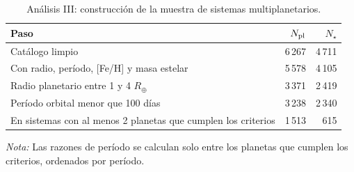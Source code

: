\begin{table}[htbp]
    \centering
    \caption{Análisis III: construcción de la muestra de sistemas multiplanetarios.}
    \label{tab:A3-T1}
    \small
    \begin{tabular}{p{}rr}
    \toprule
    Paso & $N_{\rm pl}$ & $N_\star$ \\
    \midrule
    Catálogo limpio & 6\,267 & 4\,711 \\
    Con radio, período, {[Fe/H]} y masa estelar & 5\,578 & 4\,105 \\
    Radio planetario entre 1 y 4 $R_\oplus$ & 3\,371 & 2\,419 \\
    Período orbital menor que 100 días & 3\,238 & 2\,340 \\
    En sistemas con al menos 2 planetas que cumplen los criterios & 1\,513 & 615 \\
    \bottomrule
    \end{tabular}
    \par\smallskip
    {\footnotesize\textit{Nota:} Las razones de período se calculan solo entre los planetas que cumplen los criterios, ordenados por período.}
\end{table}
